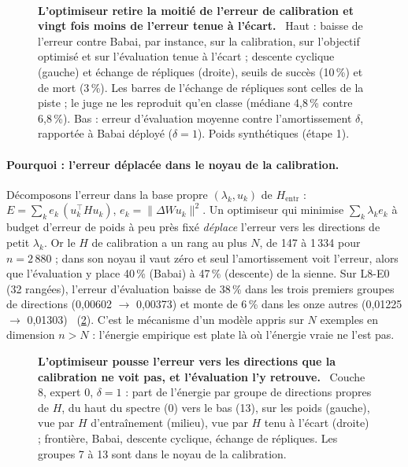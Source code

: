 \begin{figure}[tbp]
\centering
{}\\[4pt]
\caption[P5 : gains par instance et amortissement]{\textbf{L'optimiseur retire la moitié de l'erreur de calibration et vingt fois moins de l'erreur tenue à l'écart.} \mes~Haut : baisse de l'erreur contre Babai, par instance, sur la calibration, sur l'objectif optimisé et sur l'évaluation tenue à l'écart ; descente cyclique (gauche) et échange de répliques (droite), seuils de succès (10\,\%) et de mort (3\,\%). Les barres de l'échange de répliques sont celles de la piste ; le juge ne les reproduit qu'en classe (médiane 4,8\,\% contre 6,8\,\%). Bas : erreur d'évaluation moyenne contre l'amortissement $\delta$, rapportée à Babai déployé ($\delta = 1$). Poids synthétiques (étape 1). \HorsStyle{}}
\label{fig:t3-mim-p5-gains}
\end{figure}

\paragraph{Pourquoi : l'erreur déplacée dans le noyau de la calibration.} Décomposons l'erreur dans la base propre $(\lambda_k, u_k)$ de $H_{\text{entr}}$ : $E = \sum_k e_k\,(u_k^\top H u_k)$, $e_k = \lVert \Delta W u_k \rVert^2$. Un optimiseur qui minimise $\sum_k \lambda_k e_k$ à budget d'erreur de poids à peu près fixé \emph{déplace} l'erreur vers les directions de petit $\lambda_k$. Or le $H$ de calibration a un rang au plus $N$, de 147 à 1\,334 pour $n = 2\,880$ ; dans son noyau il vaut zéro et seul l'amortissement voit l'erreur, alors que l'évaluation y place 40\,\% (Babai) à 47\,\% (descente) de la sienne. Sur L8-E0 (32 rangées), l'erreur d'évaluation baisse de 38\,\% dans les trois premiers groupes de directions (0,00602 $\to$ 0,00373) et monte de 6\,\% dans les onze autres (0,01225 $\to$ 0,01303) \mes~(\cref{fig:t3-mim-p5-spectre}). C'est le mécanisme d'un modèle appris sur $N$ exemples en dimension $n > N$ : l'énergie empirique est plate là où l'énergie vraie ne l'est pas.

\begin{figure}[tbp]
\centering
{}
\caption[P5 : où l'erreur est déplacée]{\textbf{L'optimiseur pousse l'erreur vers les directions que la calibration ne voit pas, et l'évaluation l'y retrouve.} \mes~Couche 8, expert 0, $\delta = 1$ : part de l'énergie par groupe de directions propres de $H$, du haut du spectre (0) vers le bas (13), sur les poids (gauche), vue par $H$ d'entraînement (milieu), vue par $H$ tenu à l'écart (droite) ; frontière, Babai, descente cyclique, échange de répliques. Les groupes 7 à 13 sont dans le noyau de la calibration. \HorsStyle{}}
\label{fig:t3-mim-p5-spectre}
\end{figure}

